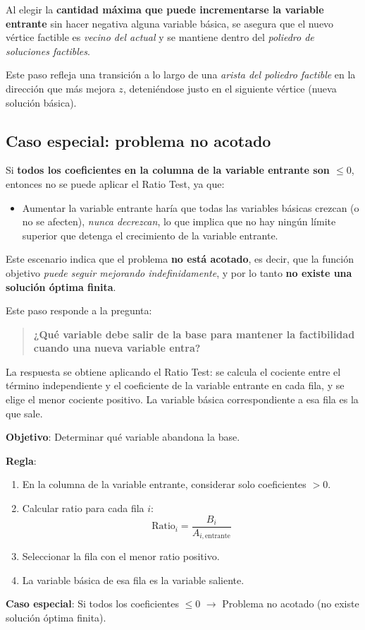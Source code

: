 Al elegir la \textbf{cantidad máxima que puede incrementarse la variable
entrante} sin hacer negativa alguna variable básica, se asegura que el nuevo
vértice factible es \emph{vecino del actual} y se mantiene dentro del
\emph{poliedro de soluciones factibles}.

Este paso refleja una transición a lo largo de una \emph{arista del poliedro
factible} en la dirección que más mejora \(z\), deteniéndose justo en el
siguiente vértice (nueva solución básica).

\subsection*{Caso especial: problema no acotado}

Si \textbf{todos los coeficientes en la columna de la variable entrante son
\(\leq 0\)}, entonces no se puede aplicar el Ratio Test, ya que:

\begin{itemize}
  \item Aumentar la variable entrante haría que todas las variables básicas
    crezcan (o no se afecten), \emph{nunca decrezcan}, lo que implica que no hay
    ningún límite superior que detenga el crecimiento de la variable entrante.
\end{itemize}

Este escenario indica que el problema \textbf{no está acotado}, es decir, que la
función objetivo \emph{puede seguir mejorando indefinidamente}, y por lo tanto
\textbf{no existe una solución óptima finita}.

Este paso responde a la pregunta:
\begin{quote}
  \textbf{¿Qué variable debe salir de la base para mantener la factibilidad cuando
  una nueva variable entra?}
\end{quote}

La respuesta se obtiene aplicando el Ratio Test: se calcula el cociente entre
el término independiente y el coeficiente de la variable entrante en cada fila,
y se elige el menor cociente positivo. La variable básica correspondiente a
esa fila es la que sale.

\begin{tcolorbox}[title=Resumen del paso 3]
  \noindent \textbf{Objetivo}: Determinar qué variable abandona la base.
  
  \noindent \textbf{Regla}:
  \begin{enumerate}
    \item En la columna de la variable entrante, considerar solo coeficientes \(> 0\).
    \item Calcular ratio para cada fila \(i\):
     \[
     \text{Ratio}_i = \frac{B_i}{A_{i,\text{entrante}}}
     \]
    \item Seleccionar la fila con el menor ratio positivo.
    \item La variable básica de esa fila es la variable saliente.
  \end{enumerate}
  
  \noindent \textbf{Caso especial}: Si todos los coeficientes \(\leq 0\) \(\rightarrow\) Problema no acotado (no existe solución óptima finita).
\end{tcolorbox}

